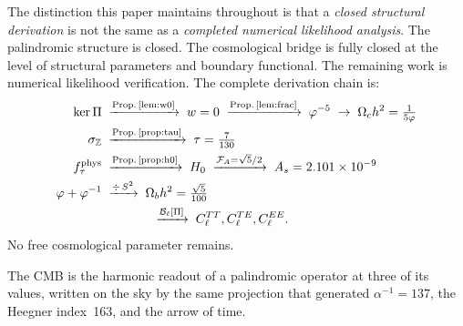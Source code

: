 \documentclass[twocolumn,10pt]{article}
\newcommand{\vp}{\varphi}
\newcommand{\kerPi}{\ker\Pi}
\begin{document}
The distinction this paper maintains throughout is that a
\emph{closed structural derivation} is not the same as a
\emph{completed numerical likelihood analysis}.
The palindromic structure is closed.
The cosmological bridge is fully closed at the level of structural
parameters and boundary functional.
The remaining work is numerical likelihood verification.
The complete derivation chain is:
\begin{align*}
  \kerPi &\;\xrightarrow{\text{Prop.\,\ref{lem:w0}}}\; w=0
          \;\xrightarrow{\text{Prop.\,\ref{lem:frac}}}\; \vp^{-5}
          \;\to\; \Omega_ch^2 = \tfrac{1}{5\vp}\\
  \sigma_{\mathbb{Z}} &\;\xrightarrow{\text{Prop.\,\ref{prop:tau}}}\;
          \tau = \tfrac{7}{130}\\
  f_\tau^{\rm phys} &\;\xrightarrow{\text{Prop.\,\ref{prop:h0}}}\;
          H_0 \;\xrightarrow{\mathcal{F}_A=\sqrt{5}/2}\;
          A_s = 2.101\times10^{-9}\\
  \vp+\vp^{-1} &\;\xrightarrow{\div\,S^2}\;
          \Omega_bh^2 = \tfrac{\sqrt{5}}{100}\\
          &\hspace{4em}\xrightarrow{\mathcal{B}_\ell[\Pi]}\;
          C_\ell^{TT},C_\ell^{TE},C_\ell^{EE}.
\end{align*}
No free cosmological parameter remains.

The CMB is the harmonic readout of a palindromic operator at three
of its values, written on the sky by the same projection that
generated $\alpha^{-1}=137$, the Heegner index~163, and the arrow
of time.
\end{document}
